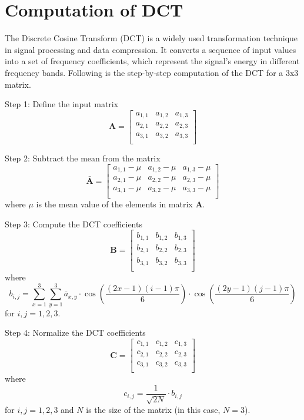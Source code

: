 
\chapter{Computation of DCT}
\label{AppendixA}

The Discrete Cosine Transform (DCT) is a widely used transformation technique in signal processing and data compression. It converts a sequence of input values into a set of frequency coefficients, which represent the signal's energy in different frequency bands. 
Following is the step-by-step computation of the DCT for a 3x3 matrix.

Step 1: Define the input matrix
\[
\mathbf{A} = \begin{bmatrix}
	a_{1,1} & a_{1,2} & a_{1,3} \\
	a_{2,1} & a_{2,2} & a_{2,3} \\
	a_{3,1} & a_{3,2} & a_{3,3} \\
\end{bmatrix}
\]

Step 2: Subtract the mean from the matrix
\[
\bar{\mathbf{A}} = \begin{bmatrix}
	a_{1,1} - \mu & a_{1,2} - \mu & a_{1,3} - \mu \\
	a_{2,1} - \mu & a_{2,2} - \mu & a_{2,3} - \mu \\
	a_{3,1} - \mu & a_{3,2} - \mu & a_{3,3} - \mu \\
\end{bmatrix}
\]
where \(\mu\) is the mean value of the elements in matrix \(\mathbf{A}\).

Step 3: Compute the DCT coefficients
\[
\mathbf{B} = \begin{bmatrix}
	b_{1,1} & b_{1,2} & b_{1,3} \\
	b_{2,1} & b_{2,2} & b_{2,3} \\
	b_{3,1} & b_{3,2} & b_{3,3} \\
\end{bmatrix}
\]
where
\[
b_{i,j} = \sum_{x=1}^{3} \sum_{y=1}^{3} \bar{a}_{x,y} \cdot \cos\left(\frac{(2x-1)(i-1)\pi}{6}\right) \cdot \cos\left(\frac{(2y-1)(j-1)\pi}{6}\right)
\]
for \(i,j = 1,2,3\).

Step 4: Normalize the DCT coefficients
\[
\mathbf{C} = \begin{bmatrix}
	c_{1,1} & c_{1,2} & c_{1,3} \\
	c_{2,1} & c_{2,2} & c_{2,3} \\
	c_{3,1} & c_{3,2} & c_{3,3} \\
\end{bmatrix}
\]
where
\[
c_{i,j} = \frac{1}{\sqrt{2N}} \cdot b_{i,j}
\]
for \(i,j = 1,2,3\) and \(N\) is the size of the matrix (in this case, \(N = 3\)).

